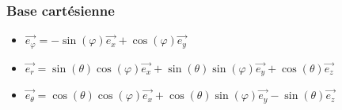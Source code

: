 \documentclass[french]{yLectureNote}
\renewcommand{\vec}{\overrightarrow}
\begin{document}
\subsubsection{Base cartésienne}
\begin{itemize}
 \item $\vec{e_{\varphi}} = -\sin(\varphi)\vec{e_x} + \cos(\varphi)\vec{e_y}$
 \item $\vec{e_{r}} = \sin(\theta)\cos(\varphi) \vec{e_x} + \sin(\theta)\sin(\varphi) \vec{e_y}+\cos(\theta)\vec{e_z}$
 \item $\vec{e_{\theta}} = \cos(\theta)\cos(\varphi) \vec{e_x} +\cos(\theta)\sin(\varphi) \vec{e_y} - \sin(\theta)\vec{e_z}$
\end{itemize}
\end{document}
